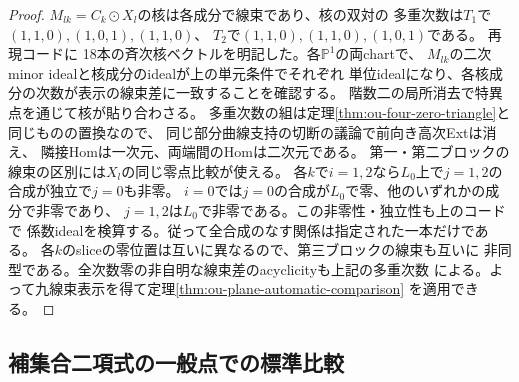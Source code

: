 \begin{proof}
$M_{lk}=C_k\odot X_l$の核は各成分で線束であり、核の双対の
多重次数は$T_1$で$(1,1,0),(1,0,1),(1,1,0)$、
$T_2$で$(1,1,0),(1,1,0),(1,0,1)$である。
再現コードに
18本の斉次核ベクトルを明記した。各$\mathbb P^1$の両chartで、
$M_{lk}$の二次minor idealと核成分のidealが上の単元条件でそれぞれ
単位idealになり、各核成分の次数が表示の線束差に一致することを確認する。
階数二の局所消去で特異点を通じて核が貼り合わさる。
多重次数の組は定理\ref{thm:ou-four-zero-triangle}と同じものの置換なので、
同じ部分曲線支持の切断の議論で前向き高次Extは消え、
隣接Homは一次元、両端間のHomは二次元である。
第一・第二ブロックの線束の区別には$X_l$の同じ零点比較が使える。
各$k$で$i=1,2$なら$L_0$上で$j=1,2$の合成が独立で$j=0$も非零。
$i=0$では$j=0$の合成が$L_0$で零、他のいずれかの成分で非零であり、
$j=1,2$は$L_0$で非零である。この非零性・独立性も上のコードで
係数idealを検算する。従って全合成のなす関係は指定された一本だけである。
各$k$のsliceの零位置は互いに異なるので、第三ブロックの線束も互いに
非同型である。全次数零の非自明な線束差のacyclicityも上記の多重次数
による。よって九線束表示を得て定理\ref{thm:ou-plane-automatic-comparison}
を適用できる。
\end{proof}

\subsection{補集合二項式の一般点での標準比較}
\label{subsec:ou-complement-line-conic}

